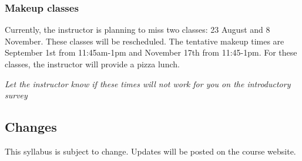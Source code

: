 \documentclass{article}
\begin{document}
\hypertarget{makeup_classes_30}{}\subsubsection*{{Makeup classes}}\label{makeup_classes_30}

Currently, the instructor is planning to miss two classes: 23 August and 8 November. These classes will be rescheduled. The tentative makeup times are September 1st from 11:45am-1pm and November 17th from 11:45-1pm. For these classes, the instructor will provide a pizza lunch.

\emph{Let the instructor know if these times will not work for you on the introductory survey}

\hypertarget{changes_31}{}\subsection*{{Changes}}\label{changes_31}

This syllabus is subject to change. Updates will be posted on the course website.
\end{document}
